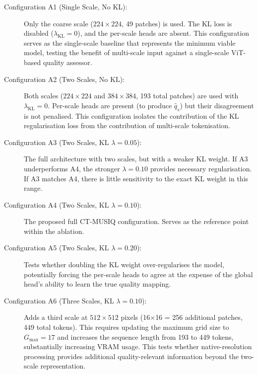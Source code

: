 \begin{description}
    \item[Configuration A1 (Single Scale, No KL):] Only the coarse scale ($224 \times
    224$, 49 patches) is used. The KL loss is disabled ($\lambda_{\text{KL}} = 0$),
    and the per-scale heads are absent. This configuration serves as the single-scale
    baseline that represents the minimum viable model, testing the benefit of multi-scale
    input against a single-scale ViT-based quality assessor.

    \item[Configuration A2 (Two Scales, No KL):] Both scales ($224 \times 224$ and
    $384 \times 384$, 193 total patches) are used with $\lambda_{\text{KL}} = 0$.
    Per-scale heads are present (to produce $\hat{q}_s$) but their disagreement is not
    penalised. This configuration isolates the contribution of the KL regularisation
    loss from the contribution of multi-scale tokenisation.

    \item[Configuration A3 (Two Scales, KL $\lambda = 0.05$):] The full architecture
    with two scales, but with a weaker KL weight. If A3 underperforms A4, the stronger
    $\lambda = 0.10$ provides necessary regularisation. If A3 matches A4, there is little
    sensitivity to the exact KL weight in this range.

    \item[Configuration A4 (Two Scales, KL $\lambda = 0.10$):] The proposed full
    CT-MUSIQ configuration. Serves as the reference point within the ablation.

    \item[Configuration A5 (Two Scales, KL $\lambda = 0.20$):] Tests whether doubling
    the KL weight over-regularises the model, potentially forcing the per-scale heads to
    agree at the expense of the global head's ability to learn the true quality mapping.

    \item[Configuration A6 (Three Scales, KL $\lambda = 0.10$):] Adds a third scale at
    $512 \times 512$ pixels (16$\times$16 = 256 additional patches, 449 total tokens).
    This requires updating the maximum grid size to $G_{\max} = 17$ and increases the
    sequence length from 193 to 449 tokens, substantially increasing VRAM usage. This
    tests whether native-resolution processing provides additional quality-relevant
    information beyond the two-scale representation.
\end{description}

